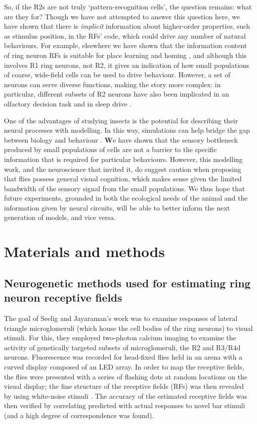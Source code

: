 So, if the R2s are not truly `pattern-recognition cells', the question remains: what are they for?
Though we have not attempted to answer this question here, we have shown that there is \emph{implicit} information about higher-order properties, such as stimulus position, in the \acp{RF}' code, which could drive any number of natural behaviours.
For example, elsewhere we have shown that the information content of ring neuron \acp{RF} is suitable for place learning and homing \cite{Dewar2015,Ofstad2011}, and although this involves R1 ring neurons, not R2, it gives an indication of how small populations of coarse, wide-field cells can be used to drive behaviour.
However, a set of neurons can serve diverse functions, making the story more complex: in particular, different subsets of R2 neurons have also been implicated in an olfactory decision task \cite{Azanchi2013} and in sleep drive \cite{Liu2016}.

One of the advantages of studying insects is the potential for describing their neural processes with modelling.
In this way, simulations can help bridge the gap between biology and behaviour \cite{Webb2009}.
{\textbf
We have shown that the sensory bottleneck produced by small populations of cells are not a barrier to the specific information that is required for particular behaviours.
However, this modelling work, and the neuroscience that invited it, do suggest caution when proposing that flies possess general visual cognition, which makes sense given the limited bandwidth of the sensory signal from the small populations.
}
We thus hope that future experiments, grounded in both the ecological needs of the animal and the information given by neural circuits, will be able to better inform the next generation of models, and vice versa.

\section*{Materials and methods}
\subsection*{Neurogenetic methods used for estimating ring neuron receptive fields}
\label{sec:methods:seelig}
The goal of Seelig and Jayaraman's \cite{Seelig2013} work was to examine responses of lateral triangle microglomeruli (which house the cell bodies of the ring neurons) to visual stimuli.
For this, they employed two-photon calcium imaging to examine the activity of genetically targeted subsets of microglomeruli, the R2 and R3/R4d neurons.
Fluorescence was recorded for head-fixed flies held in an arena with a curved display composed of an LED array.
In order to map the receptive fields, the flies were presented with a series of flashing dots at random locations on the visual display; the fine structure of the receptive fields (\acp{RF}) was then revealed by using white-noise stimuli \cite{Weber2010}.
The accuracy of the estimated receptive fields was then verified by correlating predicted with actual responses to novel bar stimuli (and a high degree of correspondence was found).

